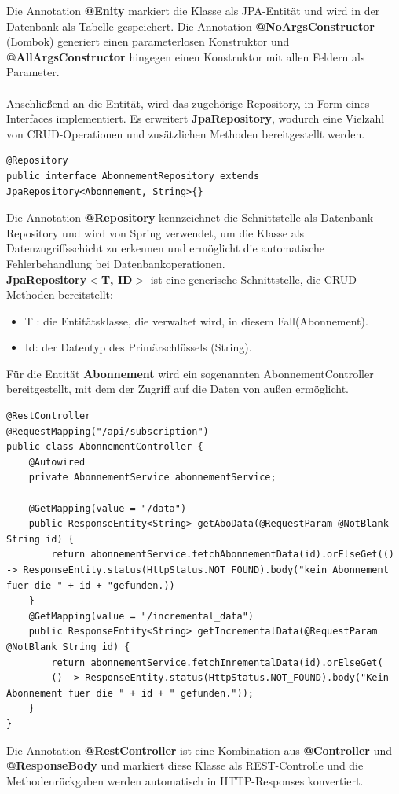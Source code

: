 \documentclass[a4paper,12pt]{scrreprt}
\begin{document}
	Die Annotation \textbf{@Enity} markiert die Klasse als JPA-Entität und wird in der Datenbank als Tabelle gespeichert. Die Annotation \textbf{@NoArgsConstructor} (Lombok) generiert einen parameterlosen Konstruktor und \textbf{@AllArgsConstructor} hingegen einen Konstruktor mit allen Feldern als Parameter.\\ \\
	Anschließend an die Entität, wird das zugehörige Repository, in Form eines Interfaces implementiert. Es erweitert \textbf{JpaRepository}, wodurch eine Vielzahl von CRUD-Operationen und zusätzlichen Methoden bereitgestellt werden.
\begin{lstlisting}
@Repository
public interface AbonnementRepository extends JpaRepository<Abonnement, String>{}
\end{lstlisting}
	Die Annotation \textbf{@Repository} kennzeichnet die Schnittstelle als Datenbank-Repository und wird von Spring verwendet, um die Klasse als Datenzugriffsschicht zu erkennen und ermöglicht die automatische Fehlerbehandlung bei Datenbankoperationen.\\
	\textbf{JpaRepository$<$T, ID$>$} ist eine generische Schnittstelle, die CRUD-Methoden bereitstellt:
	\begin{itemize}
		\item T : die Entitätsklasse, die verwaltet wird, in diesem Fall(Abonnement).
		\item Id: der Datentyp des Primärschlüssels (String).
	\end{itemize}
	Für die Entität \textbf{Abonnement} wird ein sogenannten AbonnementController bereitgestellt, mit dem der Zugriff auf die Daten von außen ermöglicht.
\begin{lstlisting}
@RestController
@RequestMapping("/api/subscription")
public class AbonnementController {
	@Autowired
	private AbonnementService abonnementService;
			
	@GetMapping(value = "/data")
	public ResponseEntity<String> getAboData(@RequestParam @NotBlank String id) {
		return abonnementService.fetchAbonnementData(id).orElseGet(() -> ResponseEntity.status(HttpStatus.NOT_FOUND).body("kein Abonnement fuer die " + id + "gefunden.))
	}
	@GetMapping(value = "/incremental_data")
	public ResponseEntity<String> getIncrementalData(@RequestParam @NotBlank String id) {
		return abonnementService.fetchInrementalData(id).orElseGet(
		() -> ResponseEntity.status(HttpStatus.NOT_FOUND).body("Kein Abonnement fuer die " + id + " gefunden."));
	}
}
\end{lstlisting}
Die Annotation \textbf{@RestController} ist eine Kombination aus \textbf{@Controller} und \textbf{@ResponseBody} und markiert diese Klasse als REST-Controlle und die Methodenrückgaben werden automatisch in HTTP-Responses konvertiert.\\ \\
\end{document}
